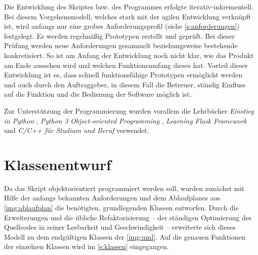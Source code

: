 \documentclass[a4paper,12pt,bibliography=totoc, listof=totoc,titlepage,pointlessnumbers]{scrreprt}
\begin{document}
Die Entwicklung des Skriptes bzw. des Programmes erfolgte iterativ-inkrementell. Bei diesem Vorgehensmodell, welches stark mit der agilen Entwicklung verknüpft ist, wird anfangs nur eine grobes Anforderungsprofil (siehe \autoref{s:anforderungen}) festgelegt. Es werden regelmäßig Prototypen erstellt und geprüft. Bei dieser Prüfung werden neue Anforderungen gesammelt beziehungsweise bestehende konkretisiert. So ist am Anfang der Entwicklung noch nicht klar, wie das Produkt am Ende aussehen wird und welchen Funktionsumfang dieses hat. Vorteil dieser Entwicklung ist es, dass schnell funktionsfähige Prototypen ermöglicht werden und auch durch den Auftraggeber, in diesem Fall die Betreuer, ständig Einfluss auf die Funktion und die Bedienung der Software möglich ist. \citep[S. 33f]{uml}

Zur Unterstützung der Programmierung wurden vorallem die Lehrbücher \textit{Einstieg in Python} \citep{python}, \textit{Python 3 Object-oriented Programming} \citep{python3oop}, \textit{Learning Flask Framework} \citep{flask} und \textit{C/C++ für Studium und Beruf} \citep{cpp} verwendet.

\section{Klassenentwurf}
Da das Skript objektorientiert programmiert werden soll, wurden zunächst mit Hilfe der anfangs bekannten Anforderungen und dem Ablaufplanes aus \autoref{img:ablaufplan} die benötigten, grundlegenden Klassen entworfen. Durch die Erweiterungen und die übliche Refaktorisierung -- der ständigen Optimierung des Quellcodes in seiner Lesbarkeit und Geschwindigkeit \citep[S. 255]{uml} -- erweiterte sich dieses Modell zu dem endgültigen Klassen der \autoref{img:uml}. Auf die genauen Funktionen der einzelnen Klassen wird im \autoref{s:klassen} eingegangen.
\end{document}
